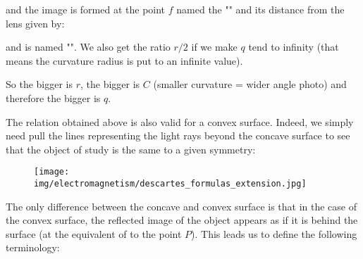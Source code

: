 	and the image is formed at the point $f$ named the  "" and its distance from the lens given by:
	
	and is named "". We also get the ratio $r/2$ if we make $q$ tend to infinity (that means the curvature radius is put to an infinite value).
	
	So the bigger is $r$, the bigger is $C$ (smaller curvature = wider angle photo) and therefore the bigger is $q$.

	The relation obtained above is also valid for a convex surface. Indeed, we simply need pull the lines representing the light rays beyond the concave surface to see that the object of study is the same to a given symmetry:
	\begin{figure}[H]
		\centering
		\texttt{[image: img/electromagnetism/descartes\_formulas\_extension.jpg]}
	\end{figure}
	The only difference between the concave and convex surface is that in the case of the convex surface, the reflected image of the object appears as if it is behind the surface (at the equivalent of to the point $P$). This leads us to define the following terminology:
	

